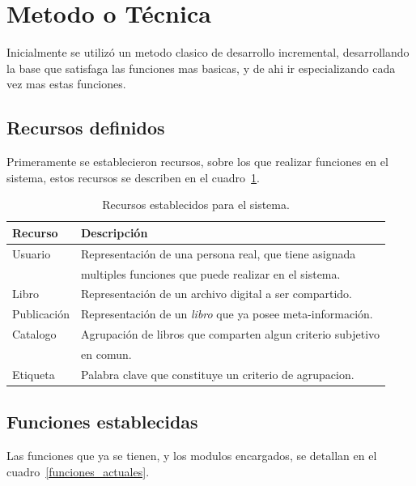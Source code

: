 \documentclass[letter,12pt]{article}
\begin{document}
\section{Metodo o Técnica}
Inicialmente se utilizó un metodo clasico de desarrollo incremental, desarrollando la base que satisfaga las funciones
mas basicas, y de ahi ir especializando cada vez mas estas funciones.

\subsection{Recursos definidos}
Primeramente se establecieron recursos, sobre los que realizar funciones en el sistema, estos recursos se describen en el
cuadro~\ref{recursos_actuales}.

\begin{table}
\begin{tabular}{l|l}
Recurso & Descripción \\
\hline
Usuario     & Representación de una persona real, que tiene asignada    \\
            & multiples funciones que puede realizar en el sistema.     \\
Libro       & Representación de un archivo digital a ser compartido.    \\
Publicación & Representación de un \emph{libro} que ya posee meta-información. \\
Catalogo    & Agrupación de libros que comparten algun criterio subjetivo \\
		    & en comun.                                                 \\
Etiqueta    & Palabra clave que constituye un criterio de agrupacion.   \\
\end{tabular}
\caption{Recursos establecidos para el sistema.}
\label{recursos_actuales}
\end{table}

\subsection{Funciones establecidas}
Las funciones que ya se tienen, y los modulos encargados, se detallan en el cuadro~\ref{funciones_actuales}.
\end{document}
